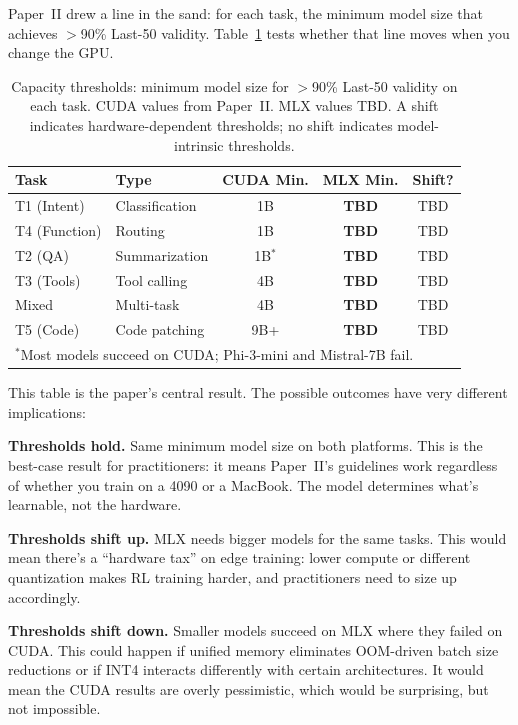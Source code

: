 \documentclass[11pt]{article}
\begin{document}
Paper~II drew a line in the sand: for each task, the minimum model size that achieves $>$90\% Last-50 validity.  Table~\ref{tab:threshold-comparison} tests whether that line moves when you change the GPU.

\begin{table}[t]
\centering
\caption{Capacity thresholds: minimum model size for $>$90\% Last-50 validity on each task.  CUDA values from Paper~II. MLX values TBD. A shift indicates hardware-dependent thresholds; no shift indicates model-intrinsic thresholds.}
\label{tab:threshold-comparison}
\begin{tabular}{l l c c c}
\toprule
\textbf{Task} & \textbf{Type} & \textbf{CUDA Min.} & \textbf{MLX Min.} & \textbf{Shift?} \\
\midrule
T1 (Intent) & Classification & 1B & \textbf{TBD} & TBD \\
T4 (Function) & Routing & 1B & \textbf{TBD} & TBD \\
T2 (QA) & Summarization & 1B$^*$ & \textbf{TBD} & TBD \\
T3 (Tools) & Tool calling & 4B & \textbf{TBD} & TBD \\
Mixed & Multi-task & 4B & \textbf{TBD} & TBD \\
T5 (Code) & Code patching & 9B+ & \textbf{TBD} & TBD \\
\bottomrule
\multicolumn{5}{l}{\footnotesize $^*$Most models succeed on CUDA; Phi-3-mini and Mistral-7B fail.}
\end{tabular}
\end{table}

This table is the paper's central result.  The possible outcomes have very different implications:

\textbf{Thresholds hold.}  Same minimum model size on both platforms.  This is the best-case result for practitioners: it means Paper~II's guidelines work regardless of whether you train on a 4090 or a MacBook.  The model determines what's learnable, not the hardware.

\textbf{Thresholds shift up.}  MLX needs bigger models for the same tasks.  This would mean there's a ``hardware tax'' on edge training: lower compute or different quantization makes RL training harder, and practitioners need to size up accordingly.

\textbf{Thresholds shift down.}  Smaller models succeed on MLX where they failed on CUDA.  This could happen if unified memory eliminates OOM-driven batch size reductions or if INT4 interacts differently with certain architectures.  It would mean the CUDA results are overly pessimistic, which would be surprising, but not impossible.
\end{document}
